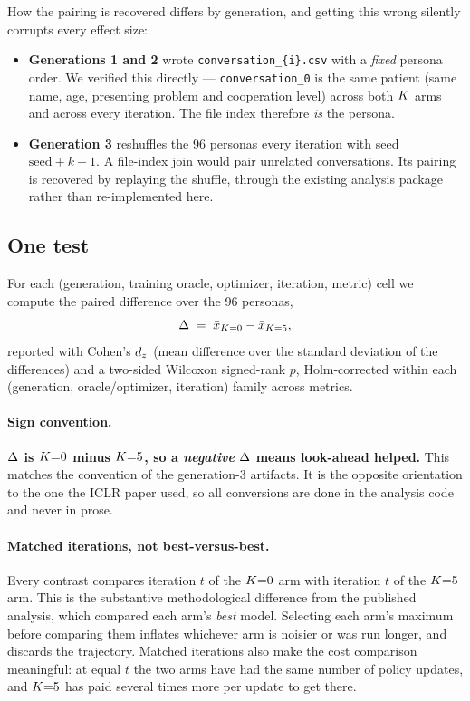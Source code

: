 How the pairing is recovered differs by generation, and getting this wrong silently corrupts
every effect size:

\begin{itemize}\itemsep2pt
  \item \textbf{Generations 1 and 2} wrote \texttt{conversation\_\{i\}.csv} with a
  \emph{fixed} persona order. We verified this directly --- \texttt{conversation\_0} is the
  same patient (same name, age, presenting problem and cooperation level) across both $K$
  arms and across every iteration. The file index therefore \emph{is} the persona.
  \item \textbf{Generation 3} reshuffles the 96 personas every iteration with seed
  $\text{seed}+k+1$. A file-index join would pair unrelated conversations. Its pairing is
  recovered by replaying the shuffle, through the existing analysis package rather than
  re-implemented here.
\end{itemize}

\subsection{One test}
\label{sec:test}
For each (generation, training oracle, optimizer, iteration, metric) cell we compute the
paired difference over the 96 personas,
\[
  \Delta \;=\; \bar{x}_{K=0} - \bar{x}_{K=5},
\]
reported with Cohen's $d_z$ (mean difference over the standard deviation of the differences)
and a two-sided Wilcoxon signed-rank $p$, Holm-corrected within each
(generation, oracle/optimizer, iteration) family across metrics.

\paragraph{Sign convention.}
\textbf{$\Delta$ is $K{=}0$ minus $K{=}5$, so a \emph{negative} $\Delta$ means look-ahead
helped.} This matches the convention of the generation-3 artifacts. It is the opposite
orientation to the one the ICLR paper used, so all conversions are done in the analysis code
and never in prose.

\paragraph{Matched iterations, not best-versus-best.}
Every contrast compares iteration $t$ of the $K{=}0$ arm with iteration $t$ of the $K{=}5$
arm. This is the substantive methodological difference from the published analysis, which
compared each arm's \emph{best} model. Selecting each arm's maximum before comparing them
inflates whichever arm is noisier or was run longer, and discards the trajectory. Matched
iterations also make the cost comparison meaningful: at equal $t$ the two arms have had the
same number of policy updates, and $K{=}5$ has paid several times more per update to get
there.

